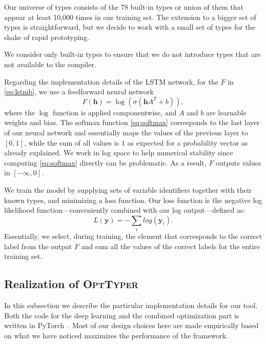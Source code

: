 \documentclass[sigplan,10pt,review,anonymous]{acmart} %
\newcommand{\projectname}{\textsc{OptTyper}\xspace}
\newcommand{\margincomment}[2]{\marginpar{\scriptsize\color{Maroon}#1 says: #2}}
\newcommand{\adg}[1]{\margincomment{ADG}{#1}}
\theoremstyle{plain}
\theoremstyle{remark}
\theoremstyle{definition}
\begin{document}
Our universe of types consists of the 78 built-in types or union of them
that appear at least 10,000 times in our training set.
The extension to a bigger set of types is straightforward, but we decide to work with a small set of types for the
shake of rapid prototyping.

We consider only built-in types
to ensure that we do not introduce types that are not available to the compiler. 

Regarding the implementation details of the LSTM network, for the $F$ in \eqref{eq:lstmb},
we use a feedforward neural network
\begin{equation}
	F(\bm{h}) = \log\left( \sigma\left(\bm{h}A^T + b \right) \right),\label{eq:feedforward}
\end{equation}
where the $\log$ function is applied componentwise,
and $A$ and $b$ are learnable weights and bias.
The softmax function \eqref{eq:softmax} corresponds to the last layer of our neural network
and essentially maps the values of the previous layer to $[0, 1]$,
while the sum of all values is $1$ as expected for a probability vector as already explained.
We work in log space to help numerical stability since computing \eqref{eq:softmax} directly can be problematic.
As a result, $F$ outputs values in $[-\infty, 0]$.

We train the model by supplying sets of variable identifiers together with their known types,
and minimizing a loss function.
Our loss function is the negative log likelihood function---conveniently combined with our log output---defined as:
\begin{equation}
	L(\bm{y}) = -\sum_i log(\bm{y}_i).
\end{equation}
Essentially, we select, during training, the element that corresponds
to the correct label from the output $F$
and sum all the values of the correct labels for the entire training set.

\subsection{Realization of \projectname{}}\label{ssec:combprodts}
In this subsection we describe the particular implementation details for our tool. Both the code for the deep learning and the combined optimization part is written in PyTorch~\cite{paszke2017}. Most of our design choices here are made empirically
based on what we have noticed maximizes the performance of the framework.
\end{document}
